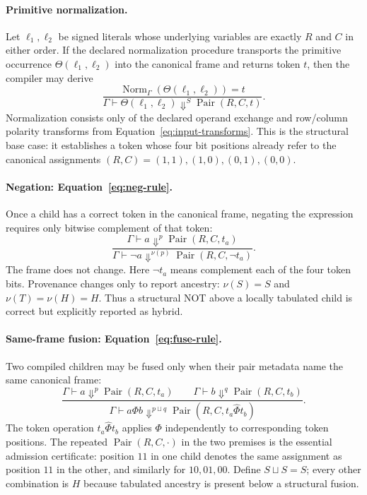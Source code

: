 \documentclass[10pt]{article}
\newcommand{\ptop}[1]{\widehat{#1}}
\newcommand{\Pair}{\operatorname{Pair}}
\theoremstyle{plain}
\theoremstyle{definition}
\theoremstyle{remark}
\begin{document}
\paragraph{Primitive normalization.}
Let $\ell_1,\ell_2$ be signed literals whose underlying variables are exactly $R$ and $C$ in either order. If the declared normalization procedure transports the primitive occurrence $\Theta(\ell_1,\ell_2)$ into the canonical frame and returns token $t$, then the compiler may derive
\[
\frac{
  \operatorname{Norm}_{\Gamma}(\Theta(\ell_1,\ell_2))=t
}{
  \Gamma\vdash \Theta(\ell_1,\ell_2)\Downarrow^S \Pair(R,C,t)
}.
\]
Normalization consists only of the declared operand exchange and row/column polarity transforms from Equation~\eqref{eq:input-transforms}. This is the structural base case: it establishes a token whose four bit positions already refer to the canonical assignments $(R,C)=(1,1),(1,0),(0,1),(0,0)$.

\paragraph{Negation: Equation~\eqref{eq:neg-rule}.}
Once a child has a correct token in the canonical frame, negating the expression requires only bitwise complement of that token:
\begin{equation}
\frac{\Gamma\vdash a\Downarrow^p\Pair(R,C,t_a)}
{\Gamma\vdash \neg a\Downarrow^{\nu(p)}\Pair(R,C,\neg t_a)}.
\label{eq:neg-rule}
\end{equation}
The frame does not change. Here $\neg t_a$ means complement each of the four token bits. Provenance changes only to report ancestry: $\nu(S)=S$ and $\nu(T)=\nu(H)=H$. Thus a structural NOT above a locally tabulated child is correct but explicitly reported as hybrid.

\paragraph{Same-frame fusion: Equation~\eqref{eq:fuse-rule}.}
Two compiled children may be fused only when their pair metadata name the same canonical frame:
\begin{equation}
\frac{\Gamma\vdash a\Downarrow^p\Pair(R,C,t_a)
\qquad
\Gamma\vdash b\Downarrow^q\Pair(R,C,t_b)}
{\Gamma\vdash a\Phi b\Downarrow^{p\sqcup q}\Pair(R,C,t_a\ptop{\Phi}t_b)}.
\label{eq:fuse-rule}
\end{equation}
The token operation $t_a\ptop{\Phi}t_b$ applies $\Phi$ independently to corresponding token positions. The repeated $\Pair(R,C,\cdot)$ in the two premises is the essential admission certificate: position $11$ in one child denotes the same assignment as position $11$ in the other, and similarly for $10,01,00$. Define $S\sqcup S=S$; every other combination is $H$ because tabulated ancestry is present below a structural fusion.
\end{document}
